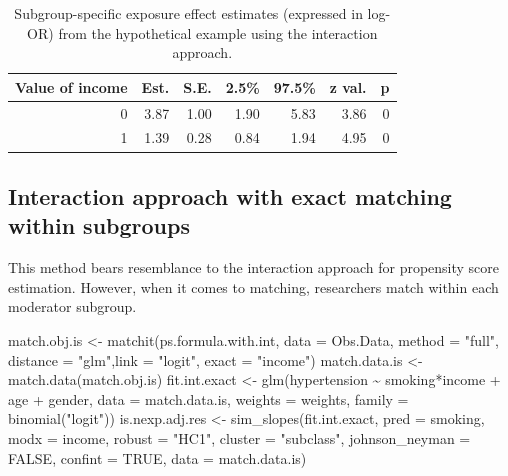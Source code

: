 \documentclass[
  letterpaper,
  DIV=11,
  numbers=noendperiod]{scrreprt}
\newenvironment{Shaded}{\begin{snugshade}}{\end{snugshade}}
\newcommand{\AttributeTok}[1]{\textcolor[rgb]{0.40,0.45,0.13}{#1}}
\newcommand{\ConstantTok}[1]{\textcolor[rgb]{0.56,0.35,0.01}{#1}}
\newcommand{\FunctionTok}[1]{\textcolor[rgb]{0.28,0.35,0.67}{#1}}
\newcommand{\NormalTok}[1]{\textcolor[rgb]{0.00,0.23,0.31}{#1}}
\newcommand{\OtherTok}[1]{\textcolor[rgb]{0.00,0.23,0.31}{#1}}
\newcommand{\SpecialCharTok}[1]{\textcolor[rgb]{0.37,0.37,0.37}{#1}}
\newcommand{\StringTok}[1]{\textcolor[rgb]{0.13,0.47,0.30}{#1}}
\begin{document}
\hypertarget{tbl-int-approach-sep}{}
\begin{table}[!h]
\caption{\label{tbl-int-approach-sep}Subgroup-specific exposure effect estimates (expressed in log-OR) from
the hypothetical example using the interaction approach. }\tabularnewline

\centering
\begin{tabular}{rrrrrrr}
\toprule
Value of income & Est. & S.E. & 2.5\% & 97.5\% & z val. & p\\
\midrule
0 & 3.87 & 1.00 & 1.90 & 5.83 & 3.86 & 0\\
1 & 1.39 & 0.28 & 0.84 & 1.94 & 4.95 & 0\\
\bottomrule
\end{tabular}
\end{table}

\hypertarget{interaction-approach-with-exact-matching-within-subgroups}{%
\subsection{Interaction approach with exact matching within
subgroups}\label{interaction-approach-with-exact-matching-within-subgroups}}

This method bears resemblance to the interaction approach for propensity
score estimation. However, when it comes to matching, researchers match
within each moderator subgroup.

\begin{Shaded}
\begin{Highlighting}[]
\NormalTok{match.obj.is }\OtherTok{\textless{}{-}} \FunctionTok{matchit}\NormalTok{(ps.formula.with.int, }\AttributeTok{data =}\NormalTok{ Obs.Data,}
                      \AttributeTok{method =} \StringTok{"full"}\NormalTok{, }\AttributeTok{distance =} \StringTok{"glm"}\NormalTok{,}\AttributeTok{link =} \StringTok{"logit"}\NormalTok{,}
                      \AttributeTok{exact =} \StringTok{"income"}\NormalTok{)}
\NormalTok{match.data.is }\OtherTok{\textless{}{-}} \FunctionTok{match.data}\NormalTok{(match.obj.is)}
\NormalTok{fit.int.exact }\OtherTok{\textless{}{-}} \FunctionTok{glm}\NormalTok{(hypertension }\SpecialCharTok{\textasciitilde{}}\NormalTok{ smoking}\SpecialCharTok{*}\NormalTok{income }\SpecialCharTok{+}\NormalTok{ age }\SpecialCharTok{+}\NormalTok{ gender, }
                     \AttributeTok{data =}\NormalTok{ match.data.is, }\AttributeTok{weights =}\NormalTok{ weights,}
                     \AttributeTok{family =} \FunctionTok{binomial}\NormalTok{(}\StringTok{"logit"}\NormalTok{))}
\NormalTok{is.nexp.adj.res }\OtherTok{\textless{}{-}} \FunctionTok{sim\_slopes}\NormalTok{(fit.int.exact, }
                              \AttributeTok{pred =}\NormalTok{ smoking, }\AttributeTok{modx =}\NormalTok{ income,}
                              \AttributeTok{robust =} \StringTok{"HC1"}\NormalTok{, }\AttributeTok{cluster =} \StringTok{"subclass"}\NormalTok{,}
                              \AttributeTok{johnson\_neyman =} \ConstantTok{FALSE}\NormalTok{, }\AttributeTok{confint =} \ConstantTok{TRUE}\NormalTok{,}
                              \AttributeTok{data =}\NormalTok{ match.data.is)}
\end{Highlighting}
\end{Shaded}
\end{document}
